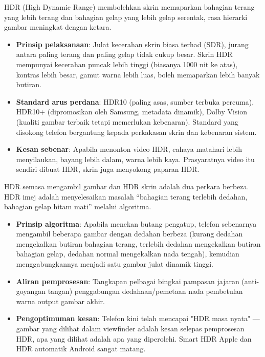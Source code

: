 HDR (High Dynamic Range) membolehkan skrin memaparkan bahagian terang yang lebih terang dan bahagian gelap yang lebih gelap serentak, rasa hierarki gambar meningkat dengan ketara.

\begin{itemize}
  \item \textbf{Prinsip pelaksanaan}: Julat kecerahan skrin biasa terhad (SDR), jurang antara paling terang dan paling gelap tidak cukup besar. Skrin HDR mempunyai kecerahan puncak lebih tinggi (biasanya 1000 nit ke atas), kontras lebih besar, gamut warna lebih luas, boleh memaparkan lebih banyak butiran.
  \item \textbf{Standard arus perdana}: HDR10 (paling asas, sumber terbuka percuma), HDR10+ (dipromosikan oleh Samsung, metadata dinamik), Dolby Vision (kualiti gambar terbaik tetapi memerlukan kebenaran). Standard yang disokong telefon bergantung kepada perkakasan skrin dan kebenaran sistem.
  \item \textbf{Kesan sebenar}: Apabila menonton video HDR, cahaya matahari lebih menyilaukan, bayang lebih dalam, warna lebih kaya. Prasyaratnya video itu sendiri dibuat HDR, skrin juga menyokong paparan HDR.
\end{itemize}


HDR semasa mengambil gambar dan HDR skrin adalah dua perkara berbeza. HDR imej adalah menyelesaikan masalah “bahagian terang terlebih dedahan, bahagian gelap hitam mati” melalui algoritma.

\begin{itemize}
  \item \textbf{Prinsip algoritma}: Apabila menekan butang pengatup, telefon sebenarnya mengambil beberapa gambar dengan dedahan berbeza (kurang dedahan mengekalkan butiran bahagian terang, terlebih dedahan mengekalkan butiran bahagian gelap, dedahan normal mengekalkan nada tengah), kemudian menggabungkannya menjadi satu gambar julat dinamik tinggi.
  \item \textbf{Aliran pemprosesan}: Tangkapan pelbagai bingkai pampasan jajaran (anti-goyangan tangan) penggabungan dedahaan/pemetaan nada pembetulan warna output gambar akhir.
  \item \textbf{Pengoptimuman kesan}: Telefon kini telah mencapai "HDR masa nyata" — gambar yang dilihat dalam viewfinder adalah kesan selepas pemprosesan HDR, apa yang dilihat adalah apa yang diperolehi. Smart HDR Apple dan HDR automatik Android sangat matang.
\end{itemize}

